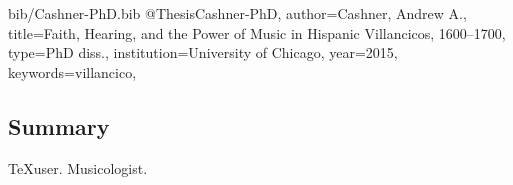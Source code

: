 
\begin{tags}
\tag{\TeX}
\end{tags}

\begin{filecontents*}{bib/Cashner-PhD.bib}
@Thesis{Cashner-PhD,
author={Cashner, Andrew A.},
title={Faith, Hearing, and the Power of Music 
	in Hispanic Villancicos, 1600--1700},
type={PhD diss.},
institution={University of Chicago},
year=2015,
keywords={villancico},
}
\end{filecontents*}
\cite{Cashner-PhD}

\subsection{Summary}

\TeX user. Musicologist.
